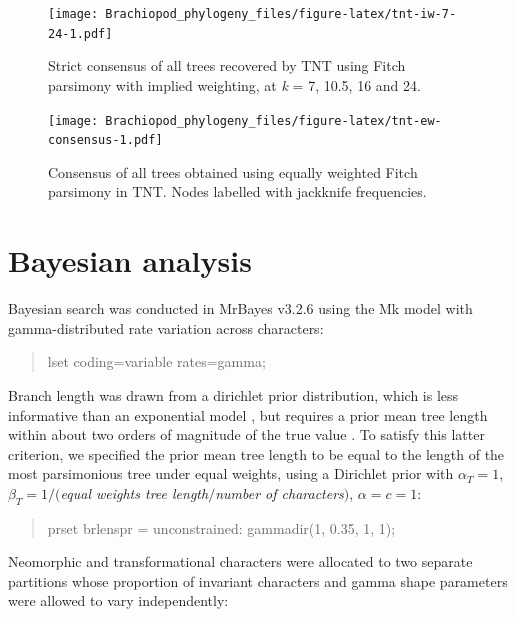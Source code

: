 \documentclass[openany]{book}
\begin{document}
\begin{figure}
\centering
\texttt{[image: Brachiopod\_phylogeny\_files/figure-latex/tnt-iw-7-24-1.pdf]}
\caption{\label{fig:tnt-iw-7-24}Strict consensus of all trees recovered by TNT
using Fitch parsimony with implied weighting, at \emph{k} = 7, 10.5, 16 and 24.}
\end{figure}

\newpage




\begin{figure}
\centering
\texttt{[image: Brachiopod\_phylogeny\_files/figure-latex/tnt-ew-consensus-1.pdf]}
\caption{\label{fig:tnt-ew-consensus}Consensus of all trees obtained using equally weighted
Fitch parsimony in TNT. Nodes labelled with jackknife frequencies.}
\end{figure}

\hypertarget{bayesian}{\chapter{Bayesian analysis}\label{bayesian}}

Bayesian search was conducted in MrBayes v3.2.6 \citep{Ronquist2012}
using the Mk model \citep{Lewis2001} with gamma-distributed rate
variation across characters:

\begin{quote}
lset coding=variable rates=gamma;
\end{quote}

Branch length was drawn from a dirichlet prior distribution, which is
less informative than an exponential model \citep{Rannala2012}, but
requires a prior mean tree length within about two orders of magnitude
of the true value \citep{Zhang2012}. To satisfy this latter criterion,
we specified the prior mean tree length to be equal to the length of the
most parsimonious tree under equal weights, using a Dirichlet prior with
\(\alpha_T = 1\), \(\beta_T = 1/(\)\emph{equal weights tree
length}\(/\)\emph{number of characters}\()\), \(\alpha = c = 1\):

\begin{quote}
prset brlenspr = unconstrained: gammadir(1, 0.35, 1, 1);
\end{quote}

Neomorphic and transformational characters
\citep[\emph{sensu}][]{Sereno2007} were allocated to two separate
partitions whose proportion of invariant characters and gamma shape
parameters were allowed to vary independently:
\end{document}
